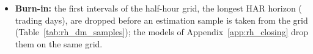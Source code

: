 \begin{itemize}
\item \textbf{Burn-in:} the first \rhdmBurnIn{} intervals of the half-hour grid, the longest HAR horizon
  (\rhdmBurnInDaysGrid{} trading days), are dropped before an estimation sample is taken from the grid
  (Table~\ref{tab:rh_dm_samples}); the models of Appendix~\ref{app:rh_closing} drop them on the same grid.

\end{itemize}
